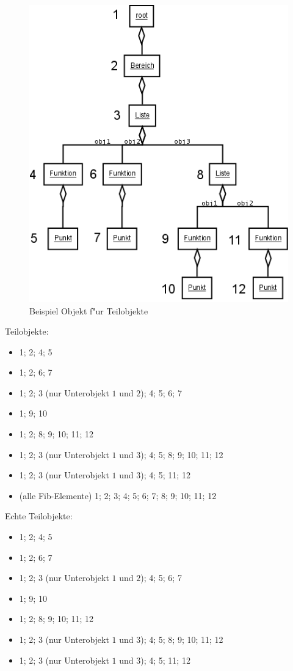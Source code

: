 \begin{figure}[htbp]
\begin{center}
  \includegraphics[scale=0.5]{order_elements}
\end{center}
\caption{Beispiel Objekt f"ur Teilobjekte}
\label{figOrderFibElementsPartobjects}
\end{figure}


\bigskip\noindent
Teilobjekte:
\begin{itemize}
 \item 1; 2; 4; 5
 \item 1; 2; 6; 7
 \item 1; 2; 3 (nur Unterobjekt $1$ und $2$); 4; 5; 6; 7
 \item 1; 9; 10
 \item 1; 2; 8; 9; 10; 11; 12
 \item 1; 2; 3 (nur Unterobjekt $1$ und $3$); 4; 5; 8; 9; 10; 11; 12
 \item 1; 2; 3 (nur Unterobjekt $1$ und $3$); 4; 5; 11; 12
 \item (alle Fib-Elemente) 1; 2; 3; 4; 5; 6; 7; 8; 9; 10; 11; 12
\end{itemize}

Echte Teilobjekte:
\begin{itemize}
 \item 1; 2; 4; 5
 \item 1; 2; 6; 7
 \item 1; 2; 3 (nur Unterobjekt $1$ und $2$); 4; 5; 6; 7
 \item 1; 9; 10
 \item 1; 2; 8; 9; 10; 11; 12
 \item 1; 2; 3 (nur Unterobjekt $1$ und $3$); 4; 5; 8; 9; 10; 11; 12
 \item 1; 2; 3 (nur Unterobjekt $1$ und $3$); 4; 5; 11; 12
\end{itemize}

